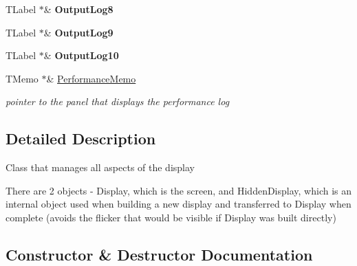 \begin{DoxyCompactItemize}
\item 
\mbox{\label{class_t_display_a9de95aeb0787e6c535cf6622b3a87d8d}} 
T\+Label $\ast$\& {\bfseries Output\+Log8}
\item 
\mbox{\label{class_t_display_a5bf597b689a283f16b1aae5fe79ad2ec}} 
T\+Label $\ast$\& {\bfseries Output\+Log9}
\item 
\mbox{\label{class_t_display_afc194f2bc9eda7fe8de600098c85d2ac}} 
T\+Label $\ast$\& {\bfseries Output\+Log10}
\item 
\mbox{\label{class_t_display_a4ecb842151b8cb4a56a72ec72b9ca682}} 
T\+Memo $\ast$\& \mbox{\hyperlink{class_t_display_a4ecb842151b8cb4a56a72ec72b9ca682}{Performance\+Memo}}
\begin{DoxyCompactList}\small\item\em pointer to the panel that displays the performance log \end{DoxyCompactList}\end{DoxyCompactItemize}


\subsection{Detailed Description}
Class that manages all aspects of the display

There are 2 objects -\/ Display, which is the screen, and Hidden\+Display, which is an internal object used when building a new display and transferred to Display when complete (avoids the flicker that would be visible if Display was built directly) 

\subsection{Constructor \& Destructor Documentation}
\mbox{\label{class_t_display_a72cbdba53131a636da2c656f6025574b}} 
